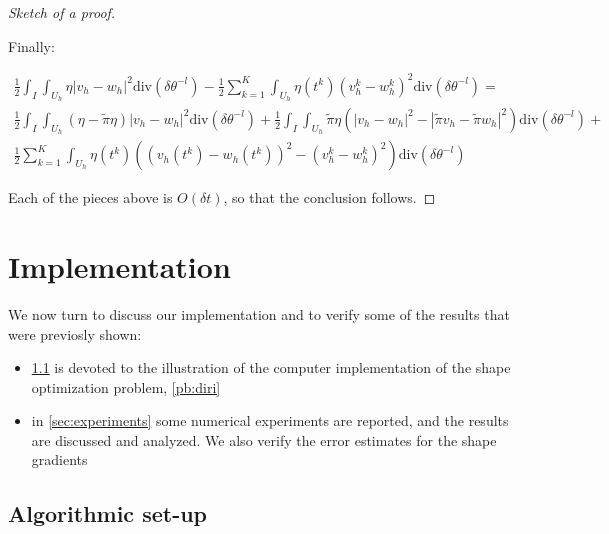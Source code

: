 \documentclass[english,a4paper,9pt,oneside]{scrbook}	%
\theoremstyle{break}
\newenvironment{mproof}[1][\proofname]{%
  \begin{proof}[#1]$ $\par\nobreak\ignorespaces
}{%
  \end{proof}
}
\renewcommand*{\proofname}{Proof}
\theoremstyle{remark}
\newcommand{\te}{\theta}
\newcommand{\dive}{\text{div}}
\begin{document}
\begin{mproof}[Sketch of a proof]
Finally:

\begin{align*}
	\frac{1}{2} \int_I \int_{U_h} \eta |v_h-w_h|^2\dive(\delta \te^{-l}) - \frac{1}{2} \sum_{k=1}^K \int_{U_h}\eta(t^k)(v_h^k-w_h^k)^2\dive(\delta \te^{-l}) = \\
	\frac{1}{2} \int_I \int_{U_h} (\eta-\tilde{\pi}\eta) |v_h-w_h|^2\dive(\delta \te^{-l})+
	\frac{1}{2} \int_I \int_{U_h} \tilde{\pi} \eta (|v_h-w_h|^2 - |\tilde{\pi} v_h-\tilde{\pi}w_h|^2)\dive(\delta \te^{-l})+\\
	\frac{1}{2} \sum_{k=1}^K \int_{U_h}\eta(t^k)((v_h(t^k)-w_h(t^k))^2-(v_h^k-w_h^k)^2)\dive(\delta \te^{-l})
\end{align*}

Each of the pieces above is $O(\delta t)$, so that the conclusion follows.
\end{mproof}

\chapter{Implementation}
\label{chap:num_exp}

We now turn to discuss our implementation and to verify some of the results that were previosly shown:

\begin{itemize}
	\item \cref{sec:implementation} is devoted to the illustration of the computer implementation of the shape optimization problem, \cref{pb:diri}
	\item in \cref{sec:experiments} some numerical experiments are reported, and the results are discussed and analyzed. We also verify the error estimates for the shape gradients
\end{itemize}

\section{Algorithmic set-up}
\label{sec:implementation}
\end{document}
